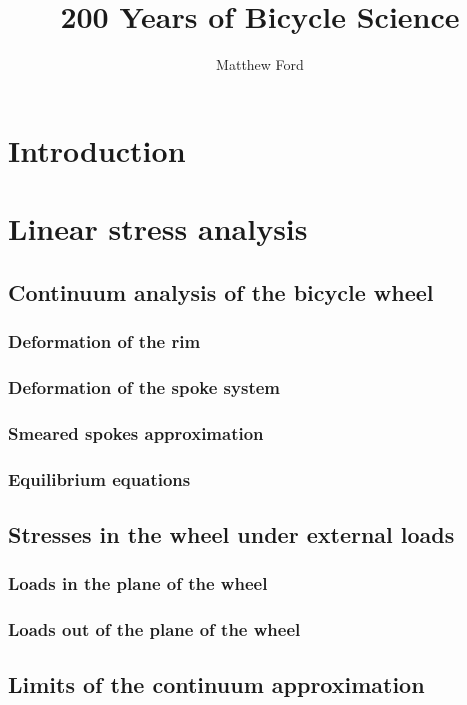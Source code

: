 \documentclass{nuthesis}
\begin{document}
\title{200 Years of Bicycle Science}
\author{Matthew Ford}

\maketitle


\tableofcontents


\chapter{Introduction}



\chapter{Linear stress analysis}
\section{Continuum analysis of the bicycle wheel}
\subsection{Deformation of the rim}
\subsection{Deformation of the spoke system}
\subsection{Smeared spokes approximation}
\subsection{Equilibrium equations}
\section{Stresses in the wheel under external loads}
\subsection{Loads in the plane of the wheel}
\subsection{Loads out of the plane of the wheel}
\section{Limits of the continuum approximation}
\end{document}
